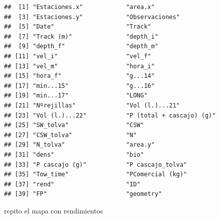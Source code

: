\documentclass[
]{article}
\begin{document}
\begin{verbatim}
##  [1] "Estaciones.x"            "area.x"                 
##  [3] "Estaciones.y"            "Observaciones"          
##  [5] "Date"                    "Track"                  
##  [7] "Track (m)"               "depth_i"                
##  [9] "depth_f"                 "depth_m"                
## [11] "vel_i"                   "vel_f"                  
## [13] "vel_m"                   "hora_i"                 
## [15] "hora_f"                  "g...14"                 
## [17] "min...15"                "g...16"                 
## [19] "min...17"                "LONG"                   
## [21] "Nºrejillas"              "Vol (l.)...21"          
## [23] "Vol (l.)...22"           "P (total + cascajo) (g)"
## [25] "SW_tolva"                "CSW"                    
## [27] "CSW_tolva"               "N"                      
## [29] "N_tolva"                 "area.y"                 
## [31] "dens"                    "bio"                    
## [33] "P cascajo (g)"           "P cascajo_tolva"        
## [35] "Tow_time"                "PComercial (kg)"        
## [37] "rend"                    "ID"                     
## [39] "FP"                      "geometry"
\end{verbatim}

repito el mapa con rendimientos
\end{document}
